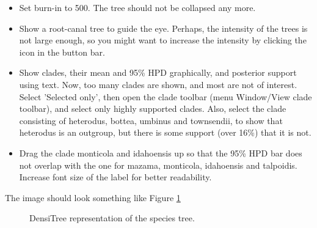 \documentclass{article}
\begin{document}
\begin{itemize}
\item Set burn-in to 500. The tree should not be collapsed any more.
\item Show a root-canal tree to guide the eye. Perhaps, the intensity of the trees is not large enough, so you might want to increase the intensity by clicking the icon in the button bar.
\item Show clades, their mean and 95\% HPD graphically, and posterior support using text. Now, too many clades are shown, and most are not of interest. Select 'Selected only', then open the clade toolbar (menu Window/View clade toolbar), and select only highly supported clades. Also, select the clade consisting of heterodus, bottea, umbinus and townsendii, to show that heterodus is an outgroup,
but there is some support (over 16\%) that it is not.
\item Drag the clade monticola and idahoensis up so that the 95\% HPD bar does not overlap with the one for mazama, monticola, idahoensis and talpoidis. Increase font size of the label for better readability.
\end{itemize}

The image should look something like Figure \ref{fig.DensiTree}

\begin{figure}
\begin{center}

\end{center}

\caption{\label{fig.DensiTree} DensiTree representation of the species tree.
}
\end{figure}
\end{document}
